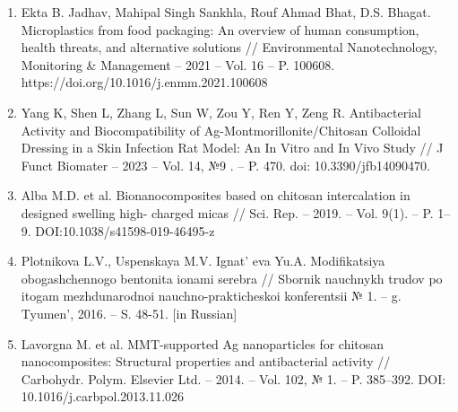 \begin{references}
\begin{enumerate}
\item
  Ekta B. Jadhav, Mahipal Singh Sankhla, Rouf Ahmad Bhat, D.S. Bhagat.
  Microplastics from food packaging: An overview of human consumption,
  health threats, and alternative solutions // Environmental
  Nanotechnology, Monitoring \& Management -- 2021 -- Vol. 16 -- P.
  100608. https://doi.org/10.1016/j.enmm.2021.100608
\item
  Yang K, Shen L, Zhang L, Sun W, Zou Y, Ren Y, Zeng R. Antibacterial
  Activity and Biocompatibility of Ag-Montmorillonite/Chitosan Colloidal
  Dressing in a Skin Infection Rat Model: An In Vitro and In Vivo Study
  // J Funct Biomater -- 2023 -- Vol. 14, №9 . -- P. 470. doi:
  10.3390/jfb14090470.
\item
  Alba M.D. et al. Bionanocomposites based on chitosan intercalation in
  designed swelling high- charged micas // Sci. Rep. -- 2019. -- Vol.
  9(1). -- P. 1--9. DOI:10.1038/s41598-019-46495-z
\item
  Plotnikova L.V., Uspenskaya M.V. Ignat' eva Yu.A.
  Modifikatsiya obogashchennogo bentonita ionami serebra // Sbornik
  nauchnykh trudov po itogam mezhdunarodnoi nauchno-prakticheskoi
  konferentsii № 1. -- g. Tyumen', 2016. -- S. 48-51.
  {[}in Russian{]}
\item
  Lavorgna M. et al. MMT-supported Ag nanoparticles for chitosan
  nanocomposites: Structural properties and antibacterial activity //
  Carbohydr. Polym. Elsevier Ltd. -- 2014. -- Vol. 102, № 1. -- P.
  385--392. DOI: 10.1016/j.carbpol.2013.11.026
\end{enumerate}
\end{references}

